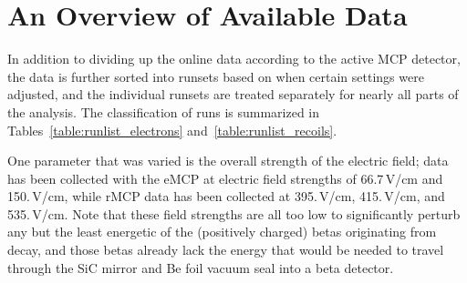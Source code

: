 \section{An Overview of Available Data}
\label{sec:data_overview}

  

In addition to dividing up the online data according to the active \ac{MCP} detector, the data is further sorted into runsets based on when certain settings were adjusted, and the individual runsets are treated separately for nearly all parts of the analysis.  The classification of runs is summarized in Tables~\ref{table:runlist_electrons} and~\ref{table:runlist_recoils}.

One parameter that was varied is the overall strength of the electric field;  data
has been collected with the eMCP at electric field strengths of 66.7\,V/cm  and 150.\,V/cm, while rMCP data has been collected at 395.\,V/cm, 415.\,V/cm, and 535.\,V/cm.  Note that these field strengths are all too low to significantly perturb any but the least energetic of the (positively charged) betas originating from decay, and those betas already lack the energy that would be needed to travel through the SiC mirror and Be foil vacuum seal into a beta detector. 






